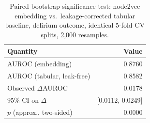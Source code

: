 \begin{table}[t]
\centering
\caption{Paired bootstrap significance test: node2vec embedding vs.\ leakage-corrected tabular baseline, delirium outcome, identical 5-fold CV splits, 2{,}000 resamples.}
\label{tab:significance}
\begin{tabular}{lr}
\toprule
Quantity & Value \\
\midrule
AUROC (embedding) & 0.8760 \\
AUROC (tabular, leak-free) & 0.8582 \\
Observed $\Delta$AUROC & 0.0178 \\
95\% CI on $\Delta$ & [0.0112, 0.0249] \\
$p$ (approx., two-sided) & 0.0000 \\
\bottomrule
\end{tabular}
\end{table}

